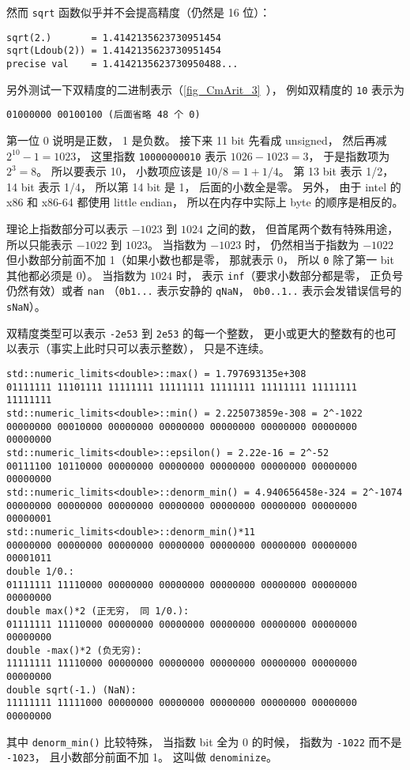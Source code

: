 然而 \verb|sqrt| 函数似乎并不会提高精度（仍然是 16 位）：
\begin{lstlisting}[language=none]
sqrt(2.)       = 1.4142135623730951454
sqrt(Ldoub(2)) = 1.4142135623730951454
precise val    = 1.4142135623730950488...
\end{lstlisting}

另外测试一下双精度的二进制表示（\autoref{fig_CmArit_3}~）， 例如双精度的 \verb|10| 表示为
\begin{lstlisting}[language=none]
01000000 00100100 (后面省略 48 个 0)
\end{lstlisting}
第一位 0 说明是正数， 1 是负数。 接下来 11 bit 先看成 unsigned， 然后再减 $2^{10}-1 = 1023$， 这里指数 \verb|10000000010| 表示 $1026-1023 = 3$， 于是指数项为 $2^{3} = 8$。 所以要表示 10， 小数项应该是 $10/8 = 1+1/4$。 第 13 bit 表示 1/2， 14 bit 表示 1/4， 所以第 14 bit 是 1， 后面的小数全是零。 另外， 由于 intel 的 x86 和 x86-64 都使用 little endian， 所以在内存中实际上 byte 的顺序是相反的。

理论上指数部分可以表示 $-1023$ 到 $1024$ 之间的数， 但首尾两个数有特殊用途， 所以只能表示 $-1022$ 到 $1023$。 当指数为 $-1023$ 时， 仍然相当于指数为 $-1022$ 但小数部分前面不加 1（如果小数也都是零， 那就表示 0， 所以 \verb|0| 除了第一 bit 其他都必须是 0）。 当指数为 $1024$ 时， 表示 \verb|inf|（要求小数部分都是零， 正负号仍然有效）或者 \verb|nan| （\verb|0b1...| 表示安静的 \verb|qNaN|， \verb|0b0..1..| 表示会发错误信号的 \verb|sNaN|）。

双精度类型可以表示 \verb|-2e53| 到 \verb|2e53| 的每一个整数， 更小或更大的整数有的也可以表示（事实上此时只可以表示整数）， 只是不连续。

\begin{lstlisting}[language=none]
std::numeric_limits<double>::max() = 1.797693135e+308
01111111 11101111 11111111 11111111 11111111 11111111 11111111 11111111
std::numeric_limits<double>::min() = 2.225073859e-308 = 2^-1022
00000000 00010000 00000000 00000000 00000000 00000000 00000000 00000000
std::numeric_limits<double>::epsilon() = 2.22e-16 = 2^-52
00111100 10110000 00000000 00000000 00000000 00000000 00000000 00000000
std::numeric_limits<double>::denorm_min() = 4.940656458e-324 = 2^-1074
00000000 00000000 00000000 00000000 00000000 00000000 00000000 00000001
std::numeric_limits<double>::denorm_min()*11
00000000 00000000 00000000 00000000 00000000 00000000 00000000 00001011
double 1/0.:
01111111 11110000 00000000 00000000 00000000 00000000 00000000 00000000
double max()*2 (正无穷， 同 1/0.):
01111111 11110000 00000000 00000000 00000000 00000000 00000000 00000000
double -max()*2 (负无穷):
11111111 11110000 00000000 00000000 00000000 00000000 00000000 00000000
double sqrt(-1.) (NaN):
11111111 11111000 00000000 00000000 00000000 00000000 00000000 00000000
\end{lstlisting}
其中 \verb|denorm_min()| 比较特殊， 当指数 bit 全为 0 的时候， 指数为 \verb|-1022| 而不是 \verb|-1023|， 且小数部分前面不加 1。 这叫做 \verb|denominize|。

